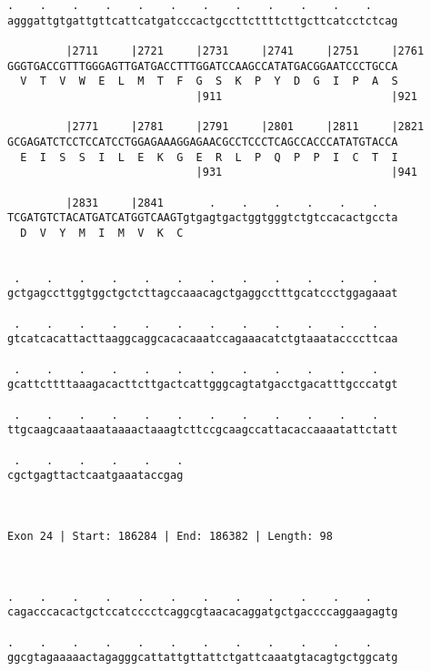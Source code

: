 \documentclass{article}
\begin{document}
\begin{Verbatim}
.    .    .    .    .    .    .    .    .    .    .    .    
agggattgtgattgttcattcatgatcccactgccttcttttcttgcttcatcctctcag
                                                            
         |2711     |2721     |2731     |2741     |2751     |2761
GGGTGACCGTTTGGGAGTTGATGACCTTTGGATCCAAGCCATATGACGGAATCCCTGCCA
  V  T  V  W  E  L  M  T  F  G  S  K  P  Y  D  G  I  P  A  S
                             |911                          |921
  
         |2771     |2781     |2791     |2801     |2811     |2821
GCGAGATCTCCTCCATCCTGGAGAAAGGAGAACGCCTCCCTCAGCCACCCATATGTACCA
  E  I  S  S  I  L  E  K  G  E  R  L  P  Q  P  P  I  C  T  I
                             |931                          |941
  
         |2831     |2841       .    .    .    .    .    .   
TCGATGTCTACATGATCATGGTCAAGTgtgagtgactggtgggtctgtccacactgccta
  D  V  Y  M  I  M  V  K  C                                 
                                                            
  
 .    .    .    .    .    .    .    .    .    .    .    .   
gctgagccttggtggctgctcttagccaaacagctgaggcctttgcatccctggagaaat
                                                            
 .    .    .    .    .    .    .    .    .    .    .    .   
gtcatcacattacttaaggcaggcacacaaatccagaaacatctgtaaataccccttcaa
                                                            
 .    .    .    .    .    .    .    .    .    .    .    .   
gcattcttttaaagacacttcttgactcattgggcagtatgacctgacatttgcccatgt
                                                            
 .    .    .    .    .    .    .    .    .    .    .    .   
ttgcaagcaaataaataaaactaaagtcttccgcaagccattacaccaaaatattctatt
                                                            
 .    .    .    .    .    .
cgctgagttactcaatgaaataccgag
                           
                           
 
Exon 24 | Start: 186284 | End: 186382 | Length: 98



.    .    .    .    .    .    .    .    .    .    .    .    
cagacccacactgctccatcccctcaggcgtaacacaggatgctgaccccaggaagagtg
                                                            
.    .    .    .    .    .    .    .    .    .    .    .    
ggcgtagaaaaactagagggcattattgttattctgattcaaatgtacagtgctggcatg
                                                            

\end{Verbatim}
\end{document}
